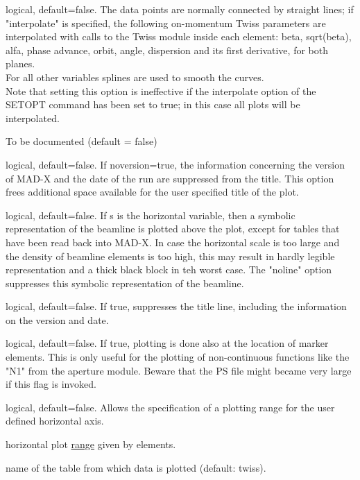 \begin{madlist}
    logical, default=false. The data points are
     normally connected by straight lines; if "interpolate" is
     specified, the following on-momentum Twiss parameters are
     interpolated with calls to the Twiss module inside 
     each element: beta, sqrt(beta), alfa, phase advance, orbit, angle,
     dispersion and its first derivative, for both planes. \\ 
     For all other variables splines are used to smooth
     the curves. \\ 
     Note that setting this option is ineffective if the interpolate
     option of the SETOPT command has been set to true; in this case all
     plots will be interpolated.  

    To be documented (default = false)

    logical, default=false. If noversion=true, the
     information concerning the version of MAD-X and the date of the run
     are suppressed from the title.  
     This option frees additional space available for the user specified
     title of the plot.  

    logical, default=false. If s is the horizontal
     variable, then a symbolic representation of the beamline is plotted
     above the plot, except for tables that have been read back into MAD-X. 
     In case the horizontal scale is too large and the density of
     beamline elements is too high, this may result in hardly legible
     representation and a thick black block in teh worst case. 
     The "noline" option suppresses this symbolic representation of the
     beamline. 

    logical, default=false. If true, suppresses the title
     line, including the information on the version and date.  

    logical, default=false. If true, plotting is done
     also at the location of marker elements. This is only useful for
     the plotting of non-continuous functions like the "N1" from the
     aperture module. Beware that the PS file might became very large if
     this flag is invoked.
  
    logical, default=false. Allows the specification
     of a plotting range for the user defined horizontal axis.   

    horizontal plot
     \href{../Introduction/ranges.html}{range} given by elements.  


    name of the table from which data is plotted (default:
     twiss).  


\end{madlist}
